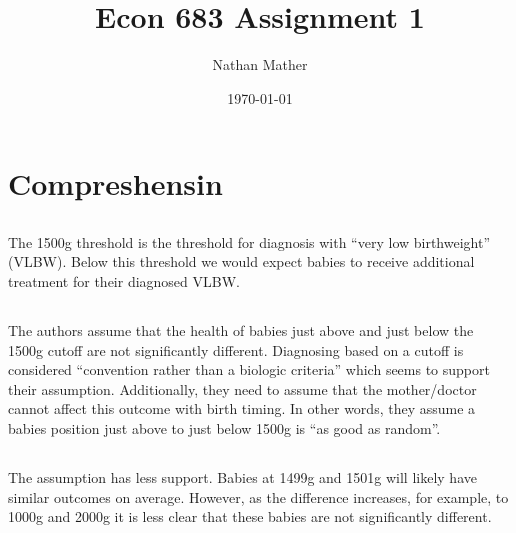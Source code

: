 \documentclass[11pt]{article}
\title{Econ 683 Assignment 1} %
\author{Nathan Mather} %
\date{\today} %
\begin{document}
	
\maketitle %

\setcounter{tocdepth}{2} %


\section{Compreshensin}

\subsection{}

The 1500g threshold is the threshold for diagnosis with “very low birthweight” (VLBW). Below this threshold we would expect babies to receive additional treatment for their diagnosed VLBW. 

\subsection{}

The authors assume that the health of babies just above and just below the 1500g cutoff are not significantly different. Diagnosing based on a cutoff is considered “convention rather than a biologic criteria” which seems to support their assumption.  Additionally, they need to assume that the mother/doctor cannot affect this outcome with birth timing. In other words, they assume a babies position just above to just below 1500g is “as good as random”. 

\subsection{}

The assumption has less support. Babies at 1499g and 1501g will likely have similar outcomes on average. However, as the difference increases, for example, to 1000g and 2000g it is less clear that these babies are not significantly different. 
\end{document}
